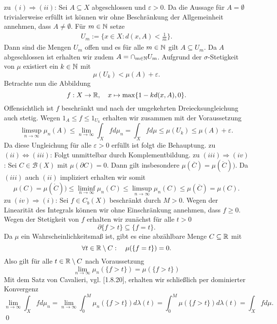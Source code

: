 \begin{proof*}
    zu $(i) \Rightarrow (ii)$: Sei $A \subseteq X$ abgeschlossen und $\varepsilon > 0$. Da die Aussage für $A = \emptyset$ trivialerweise erfüllt ist
    können wir ohne Beschränkung der Allgemeinheit annehmen, dass $A \neq \emptyset$. Für $m \in \mathbb{N}$ setze
    \begin{align*}
        U_m := \{x \in X: d(x,A) < \frac{1}{m}\}.
    \end{align*}
    Dann sind die Mengen $U_m$ offen und es für alle $m \in \mathbb{N}$ gilt $A \subseteq U_m$. Da $A$ abgeschlossen ist erhalten wir zudem $ A = \cap_{m \in \mathbb{N}} U_m$. 
    Aufgrund der $\sigma$-Stetigkeit von $\mu$ existiert ein $k \in \mathbb{N}$ mit 
    $$
        \mu(U_k) < \mu(A) + \varepsilon . 
    $$
    Betrachte nun die Abbildung 
    $$
        f:X \to \mathbb{R}, \quad x \mapsto \max\{1 - kd(x,A), 0\}.
    $$
    Offensichtlich ist $f$ beschränkt und nach der umgekehrten Dreiecksungleichung auch stetig. Wegen $1_A \leq f \leq 1_{U_k}$ erhalten wir zusammen mit der Voraussetzung 
    $$
    \limsup_{n \to \infty} \mu_n(A) \leq \lim_{n \to \infty} \int_X fd\mu_n = \int_X fd\mu \leq \mu(U_k) \leq \mu(A) + \varepsilon.
    $$
    Da diese Ungleichung für alle $\varepsilon > 0$ erfüllt ist folgt die Behauptung. 
    \newline 
    zu $(ii) \iff (iii)$: Folgt unmittelbar durch Komplementbildung. 
    \newline
    zu $(iii) \Rightarrow (iv)$: 
    Sei $C \in \mathcal{B}(X)$ mit $\mu(\partial C) = 0$. Dann gilt insbesondere $\mu(\overline{C}) = \mu(\mathring{C}))$. Da $(iii)$ auch $(ii)$ impliziert erhalten wir somit
    $$
        \mu(C) = \mu(\mathring{C})) \leq \liminf_{n \to \infty} \mu_n(C) \leq \limsup_{n \to \infty} \mu_n(C) \leq \mu(\overline{C}) = \mu(C).
    $$
    \newline 
    zu $(iv) \Rightarrow (i)$: 
    Sei $f \in C_b(X)$ beschränkt durch $M > 0$. Wegen der Linearität des Integrals können wir ohne Einschränkung annehmen, dass $f \geq 0$. 
    Wegen der Stetigkeit von $f$ erhalten wir zunächst für alle $t > 0$
    $$
        \partial\{ f > t \} \subseteq \{f = t \}. 
    $$
    Da $\mu$ ein Wahrscheinlichkeitsmaß ist, gibt es eine abzählbare Menge $C \subseteq \mathbb{R}$ mit 
    $$
        \forall t \in \mathbb{R} \setminus C: \quad \mu(\{f = t \}) = 0. 
    $$
    Also gilt für alle $t \in \mathbb{R} \setminus C$ nach Voraussetzung 
    $$
        \lim_{n \to \infty} \mu_n(\{f > t \}) = \mu(\{f > t \})
    $$
    Mit dem Satz von Cavalieri, vgl. \cite{gs}[1.8.20], erhalten wir schließlich per dominierter Konvergenz
    $$
        \lim_{n \to \infty} \int_X fd\mu_n = \lim_{n \to \infty} \int_0^M \mu_n(\{f > t \})d\lambda(t) = \int_0^M \mu(\{f > t \}) d\lambda(t) = \int_Xfd\mu. 
    $$
    \qed 
\end{proof*}